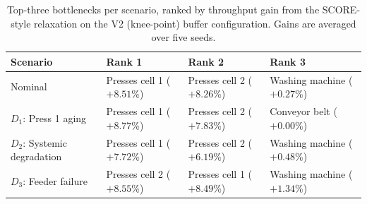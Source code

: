\documentclass[a4paper,fleqn]{cas-sc}
\begin{document}
  \begin{table}[htbp]                                                                                                                       
  \centering                                                                                                                                
  \caption{Top-three bottlenecks per scenario, ranked by throughput gain                                                                    
  from the SCORE-style relaxation on the V2 (knee-point) buffer                                                                             
  configuration. Gains are averaged over five seeds. }                                                                                     
  \label{tab:r2_top3}                                                                                                                       
  \begin{tabular}{@{}l l l l@{}}                                                                                                            
  \toprule                                                                                                                                  
  \textbf{Scenario} & \textbf{Rank 1} & \textbf{Rank 2} & \textbf{Rank 3} \\                                                                
  \midrule                                                                                                                                  
  Nominal                     & Presses cell 1 ($+8.51$\%) & Presses cell 2 ($+8.26$\%) & Washing machine ($+0.27$\%) \\                    
  $D_1$: Press 1 aging        & Presses cell 1 ($+8.77$\%) & Presses cell 2 ($+7.83$\%) & Conveyor belt ($+0.00$\%) \\                      
  $D_2$: Systemic degradation & Presses cell 1 ($+7.72$\%) & Presses cell 2 ($+6.19$\%) & Washing machine ($+0.48$\%) \\                    
  $D_3$: Feeder failure       & Presses cell 2 ($+8.55$\%) & Presses cell 1 ($+8.49$\%) & Washing machine ($+1.34$\%) \\                    
  \bottomrule                                                                                                                               
  \end{tabular}                                                                                                                             
  \end{table}                                                                                                                               
                                                                                                                                            
\end{document}
